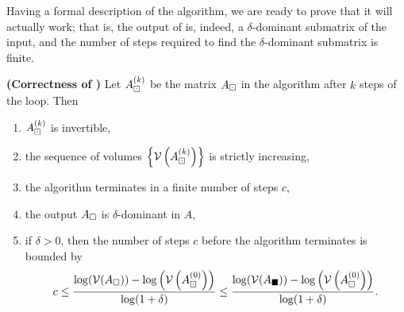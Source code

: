 \documentclass{article}
\begin{document}
	Having a formal description of the algorithm, we are ready to prove that it will actually work; that is, the output of \maxvol{} is, indeed, a $\delta$-dominant submatrix of the input, and the number of steps required to find the $\delta$-dominant submatrix is finite.
	
	\begin{thm} \textnormal{\bf(Correctness of \maxvol{} \cite{goreinov_2010})}
		\label{thm:maxvol_correctness}
		Let $A_\boxdot^{(k)}$ be the matrix $A_\boxdot$ in the \maxvol{} algorithm after $k$ steps of the loop. Then
		\begin{enumerate}
			\item $A_\boxdot^{(k)}$ is invertible,
			\item the sequence of volumes $\left\{\mathcal{V}\left(A_\boxdot^{(k)}\right)\right\}$ is strictly increasing,
			\item the \maxvol{} algorithm terminates in a finite number of steps $c$,
			\item the output $A_\square$ is $\delta$-dominant in $A$,
			\item if $\delta > 0$, then the number of steps $c$ before the algorithm terminates is bounded by
			\begin{equation}
				\label{eq:maxvol_steps_bound}
				c \le \frac{\log(\mathcal{V}(A_\square)) - \log\left(\mathcal{V}\left(A_\boxdot^{(0)}\right)\right)}{\log(1+\delta)} \le \frac{\log(\mathcal{V}(A_\blacksquare)) - \log\left(\mathcal{V}\left(A_\boxdot^{(0)}\right)\right)}{\log(1+\delta)} .
			\end{equation}
		\end{enumerate}
	\end{thm}
	
\end{document}
